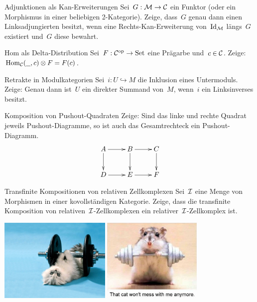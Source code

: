 \documentclass{uebblatt}
\begin{document}

\begin{aufgabe}{Adjunktionen als Kan-Erweiterungen}
Sei~$G : \mathcal{M} \to \mathcal{C}$ ein Funktor (oder ein Morphismus in einer beliebigen
2-Kategorie). Zeige, dass~$G$ genau dann einen Linksadjungierten besitzt, wenn
eine Rechts-Kan-Erweiterung von~$\mathrm{Id}_{\mathcal{M}}$ längs~$G$ existiert und~$G$ diese
bewahrt.
\end{aufgabe}

\begin{aufgabe}{Hom als Delta-Distribution}
Sei~$F : \mathcal{C}^{\mathrm{op}} \to \mathrm{Set}$ eine Prägarbe und~$c \in \mathcal{C}$. Zeige:
$\mathrm{Hom}_{\mathcal{C}}(\underline{\ \ }, c) \otimes F = F(c)$.
\end{aufgabe}

\begin{aufgabe}{Retrakte in Modulkategorien}
Sei~$i : U \hookrightarrow M$ die Inklusion eines Untermoduls. Zeige: Genau
dann ist~$U$ ein direkter Summand von~$M$, wenn~$i$ ein Linksinverses besitzt.
\end{aufgabe}

\begin{aufgabe}{Komposition von Pushout-Quadraten}
Zeige: Sind das linke und rechte Quadrat jeweils Pushout-Diagramme, so ist auch
das Gesamtrechteck ein Pushout-Diagramm.
\[ \xymatrix{
  A \ar[r]\ar[d] & B \ar[r]\ar[d] & C \ar[d] \\
  D \ar[r] & E \ar[r] & F
} \]
\end{aufgabe}
\vspace{-1em}

\begin{aufgabe}{Transfinite Kompositionen von relativen Zellkomplexen}
Sei~$\mathcal{I}$ eine Menge von Morphismen in einer kovollständigen Kategorie.
Zeige, dass die transfinite Komposition von relativen~$\mathcal{I}$-Zellkomplexen
ein relativer~$\mathcal{I}$-Zellkomplex ist.
\end{aufgabe}

\vfill
\centering
\href{http://fashions-cloud.com/pages/c/cat-lifting-weights/}{\includegraphics[height=4cm]{images/lifting-property-1}}
\qquad
\href{http://www.woophotos.com/weight-lifter/}{\includegraphics[height=4cm]{images/lifting-property-2}}
\par
\end{document}

